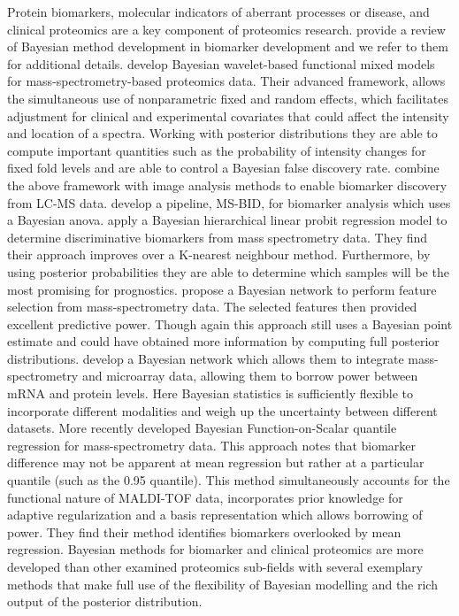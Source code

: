 \documentclass[12pt,english, journal=jpr, layout=twocolumn]{article}
\begin{document}
Protein biomarkers, molecular indicators of aberrant processes or disease, and clinical proteomics are a key component of proteomics research. \citet{Hernandez::2015} provide a review of Bayesian method development in biomarker development and we refer to them for additional details. \citet{Morris::2006, Morris::2008} develop Bayesian wavelet-based functional mixed models for mass-spectrometry-based proteomics data. Their advanced framework, allows the simultaneous use of nonparametric fixed and random effects, which facilitates adjustment for clinical and experimental covariates that could affect the intensity and location of a spectra. Working with posterior distributions they are able to compute important quantities such as the probability of intensity changes for fixed fold levels and are able to control a Bayesian false discovery rate. \citet{Liao::2014} combine the above framework with image analysis methods to enable biomarker discovery from LC-MS data. \citet{Hwang::2008} develop a pipeline, MS-BID, for biomarker analysis which uses a Bayesian anova. \citet{Harris::2009} apply a Bayesian hierarchical linear probit regression model to determine discriminative biomarkers from mass spectrometry data. They find their approach improves over a K-nearest neighbour method. Furthermore, by using posterior probabilities they are able to determine which samples will be the most promising for prognostics. \citet{Kuschner::2010} propose a Bayesian network to perform feature selection from mass-spectrometry data. The selected features then provided excellent predictive power. Though again this approach still uses a Bayesian point estimate and could have obtained more information by computing full posterior distributions. \citet{Deng::2007} develop a Bayesian network which allows them to integrate mass-spectrometry and microarray data, allowing them to borrow power between mRNA and protein levels. Here Bayesian statistics is sufficiently flexible to incorporate different modalities and weigh up the uncertainty between different datasets. More recently \citet{Liu::2020} developed Bayesian Function-on-Scalar quantile regression for mass-spectrometry data. This approach notes that biomarker difference may not be apparent at mean regression but rather at a particular quantile (such as the 0.95 quantile). This method simultaneously accounts for the functional nature of MALDI-TOF data, incorporates prior knowledge for adaptive regularization and a basis representation which allows borrowing of power. They find their method identifies biomarkers overlooked by mean regression. Bayesian methods for biomarker and clinical proteomics are more developed than other examined proteomics sub-fields with several exemplary methods that make full use of the flexibility of Bayesian modelling and the rich output of the posterior distribution. 
\end{document}
